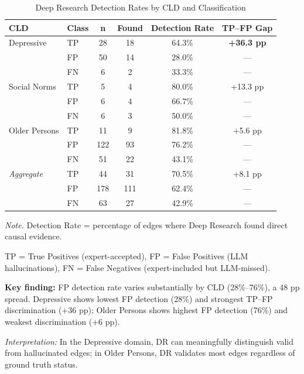 \begin{table}[H]
\centering
\caption{Deep Research Detection Rates by CLD and Classification}
\label{tab:rq3_per_cld}
\begin{threeparttable}
\begin{tabular}{llcccc}
\toprule
\textbf{CLD} & \textbf{Class} & \textbf{n} & \textbf{Found} & \textbf{Detection Rate} & \textbf{TP--FP Gap} \\
\midrule
Depressive & TP & 28 & 18 & 64.3\% & \textbf{+36.3 pp} \\
 & FP & 50 & 14 & 28.0\% & --- \\
 & FN & 6 & 2 & 33.3\% & --- \\
\midrule
Social Norms & TP & 5 & 4 & 80.0\% & +13.3 pp \\
 & FP & 6 & 4 & 66.7\% & --- \\
 & FN & 6 & 3 & 50.0\% & --- \\
\midrule
Older Persons & TP & 11 & 9 & 81.8\% & +5.6 pp \\
 & FP & 122 & 93 & 76.2\% & --- \\
 & FN & 51 & 22 & 43.1\% & --- \\
\midrule
\textit{Aggregate} & TP & 44 & 31 & 70.5\% & +8.1 pp \\
 & FP & 178 & 111 & 62.4\% & --- \\
 & FN & 63 & 27 & 42.9\% & --- \\
\bottomrule
\end{tabular}
\begin{tablenotes}
\small
\item \textit{Note.} Detection Rate = percentage of edges where Deep Research found direct causal evidence.
\item TP = True Positives (expert-accepted), FP = False Positives (LLM hallucinations), FN = False Negatives (expert-included but LLM-missed).
\item \textbf{Key finding:} FP detection rate varies substantially by CLD (28\%--76\%), a 48 pp spread. Depressive shows lowest FP detection (28\%) and strongest TP--FP discrimination (+36 pp); Older Persons shows highest FP detection (76\%) and weakest discrimination (+6 pp).
\item \textit{Interpretation:} In the Depressive domain, DR can meaningfully distinguish valid from hallucinated edges; in Older Persons, DR validates most edges regardless of ground truth status.
\end{tablenotes}
\end{threeparttable}
\end{table}

